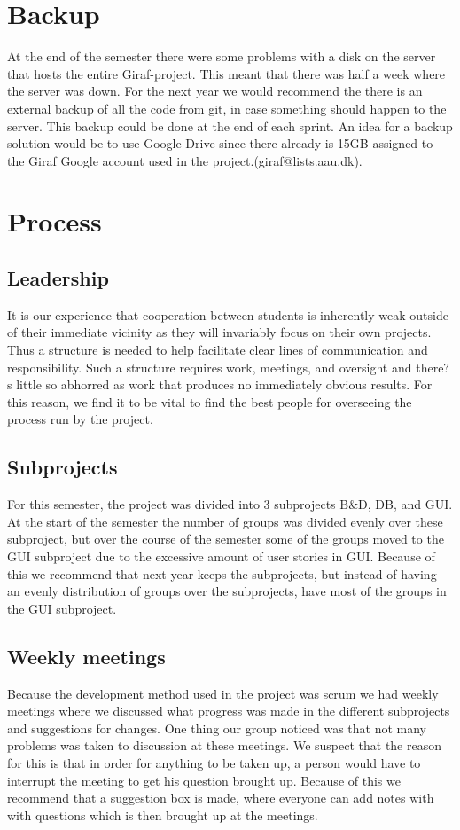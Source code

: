 \section{Backup}
At the end of the semester there were some problems with a disk on the server that hosts the entire Giraf-project. This meant that there was half a week where the server was down. For the next year we would recommend the there is an external backup of all the code from git, in case something should happen to the server. This backup could be done at the end of each sprint. An idea for a backup solution would be to use Google Drive since there already is 15GB assigned to the Giraf Google account used in the project.(giraf@lists.aau.dk). 

\section{Process}

\subsection{Leadership}
It is our experience that cooperation between students is inherently weak outside of their immediate vicinity as they will invariably focus on their own projects. Thus a structure is needed to help facilitate clear lines of communication and responsibility. Such a structure requires work, meetings, and oversight and there?s little so abhorred as work that produces no immediately obvious results.
For this reason, we find it to be vital to find the best people for overseeing the process run by the project. 

\subsection{Subprojects}
For this semester, the project was divided into 3 subprojects B&D, DB, and GUI. At the start of the semester the number of groups was divided evenly over these subproject, but over the course of the semester some of the groups moved to the GUI subproject due to the excessive amount of user stories in GUI. Because of this we recommend that next year keeps the subprojects, but instead of having an evenly distribution of groups over the subprojects, have most of the groups in the GUI subproject.

\subsection{Weekly meetings}
Because the development method used in the project was scrum we had weekly meetings where we discussed what progress was made in the different subprojects and suggestions for changes. One thing our group noticed was that not many problems was taken to discussion at these meetings. We suspect that the reason for this is that in order for anything to be taken up, a person would have to interrupt the meeting to get his question brought up. Because of this we recommend that a suggestion box is made, where everyone can add notes with with questions which is then brought up at the meetings.


